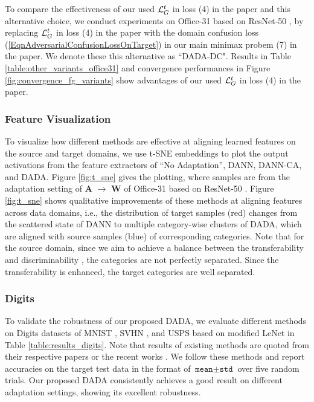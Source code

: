 \documentclass[letterpaper]{article} \usepackage{aaai20}  \usepackage{times}  \usepackage{helvet} \usepackage{courier}  \usepackage[hyphens]{url}  \usepackage{graphicx} \urlstyle{rm} \def\UrlFont{\rm}  \usepackage{graphicx}  \frenchspacing  \setlength{\pdfpagewidth}{8.5in}  \setlength{\pdfpageheight}{11in}
\begin{document}
To compare the effectiveness of our used ${\cal{L}}_G^t$ in loss (4) in the paper and this alternative choice, we conduct experiments on Office-31 \cite{office31} based on ResNet-50 \cite{resnet}, by replacing ${\cal{L}}_G^t$ in loss (4) in the paper with the domain confusion loss (\ref{EqnAdversarialConfusionLossOnTarget}) in our main minimax probem (7) in the paper. 
We denote these this alternative as ``DADA-DC". Results in Table \ref{table:other_variants_office31} and convergence performances in Figure \ref{fig:convergence_fg_variants} show advantages of our used ${\cal{L}}_G^t$ in loss (4) in the paper.

\subsubsection{Feature Visualization}
To visualize how different methods are effective at aligning learned features on the source and target domains, we use t-SNE embeddings \cite{t_sne} to plot the output activations from the feature extractors of ``No Adaptation'', DANN, DANN-CA, and DADA. Figure \ref{fig:t_sne} gives the plotting, where samples are from the adaptation setting of \textbf{A} $\rightarrow$ \textbf{W} of Office-31 \cite{office31} based on ResNet-50 \cite{resnet}. Figure \ref{fig:t_sne} shows qualitative improvements of these methods at aligning features across data domains, i.e., the distribution of target samples (red) changes from the scattered state of DANN to multiple category-wise clusters of DADA, which are aligned with source samples (blue) of corresponding categories. Note that for the source domain, since we aim to achieve a balance between the transferability and discriminability \cite{tat}, the categories are not perfectly separated. Since the transferability is enhanced, the target categories are well separated.

\subsubsection{Digits}
To validate the robustness of our proposed DADA, we evaluate different methods on Digits datasets of MNIST \cite{mnist}, SVHN \cite{svhn}, and USPS \cite{usps} based on modified LeNet in Table \ref{table:results_digits}. Note that results of existing methods are quoted from their respective papers or the recent works \cite{adr,mcd}. We follow these methods and report accuracies on the target test data in the format of $\texttt{mean}\pm\texttt{std}$ over five random trials. Our proposed DADA consistently achieves a good result on different adaptation settings, showing its excellent robustness.
\end{document}
